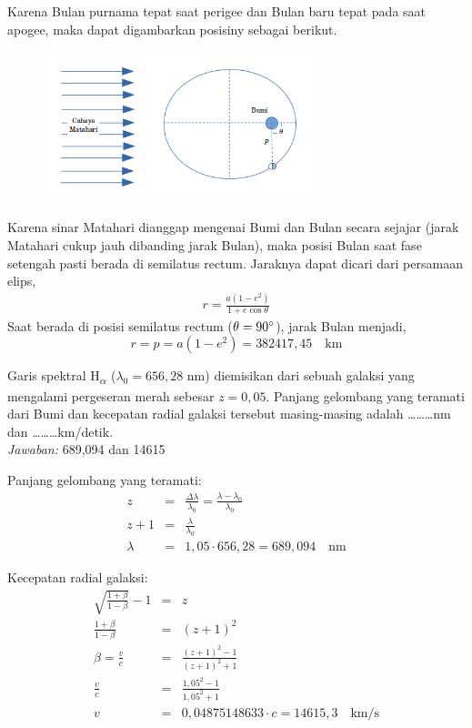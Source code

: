 \documentclass[11pt,fleqn]{exam}
\begin{document}
\begin{questions}
Karena Bulan purnama tepat saat perigee dan Bulan baru tepat pada saat apogee, maka dapat digambarkan posisiny sebagai berikut.

\begin{figure}[ht!]
\centering
\includegraphics[width=0.7\textwidth]{19.png}
\end{figure}

Karena sinar Matahari dianggap mengenai Bumi dan Bulan secara sejajar (jarak Matahari cukup jauh dibanding jarak Bulan), maka posisi Bulan saat fase setengah pasti berada di semilatus rectum. Jaraknya dapat dicari dari persamaan elips,
\begin{eqnarray*}
r = \frac{a (1 - e^2)}{1 + e \cos{\theta}}
\end{eqnarray*}
Saat berada di posisi semilatus rectum ($\theta = 90\degree$), jarak Bulan menjadi,
\begin{equation*}
r = p = a(1 - e^2) = 382417,45 \quad \text{km}
\end{equation*}

\vspace{0.3cm}
\question Garis spektral H\textsubscript{$\alpha$} ($\lambda_0=656,28$ nm) diemisikan dari sebuah galaksi yang mengalami pergeseran merah sebesar $z=0,05$. Panjang gelombang yang teramati dari Bumi dan kecepatan radial galaksi tersebut masing-masing adalah \ldots\ldots\ldots nm dan \ldots\ldots\ldots km/detik.\\

\textit{Jawaban: } 689,094 dan 14615

Panjang gelombang yang teramati:
\begin{eqnarray*}
z &=& \frac{\Delta \lambda}{\lambda_0} = \frac{\lambda - \lambda_0}{\lambda_0}\\
z + 1 &=& \frac{\lambda}{\lambda_0}\\
\lambda &=& 1,05 \cdot 656,28 = 689,094 \quad \text{nm}
\end{eqnarray*}

Kecepatan radial galaksi:
\begin{eqnarray*}
\sqrt{\frac{1 + \beta}{1 - \beta}} - 1 &=& z \\
\frac{1 + \beta}{1 - \beta} &=& (z + 1)^2 \\
\beta = \frac{v}{c} &=& \frac{(z + 1)^2 - 1}{(z + 1)^2 + 1} \\
\frac{v}{c} &=& \frac{1,05^2 - 1}{1,05^2 + 1} \\
v &=& 0,04875148633 \cdot c = 14615,3 \quad \text{km/s}
\end{eqnarray*}



\end{questions}
\end{document}
